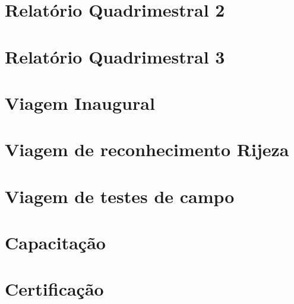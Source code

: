 \documentclass[a4paper,11pt,oneside,brazilian,
draft=false,twocolumn]{report}%
\begin{document}
\chapter{Relatório Quadrimestral 2}


\chapter{Relatório Quadrimestral 3}


\chapter{Viagem Inaugural}



\chapter{Viagem de reconhecimento Rijeza}



\chapter{Viagem de testes de campo}




\chapter{Capacitação}


\chapter{Certificação}







 
 
%
%
%
%
%
%
\end{document}

